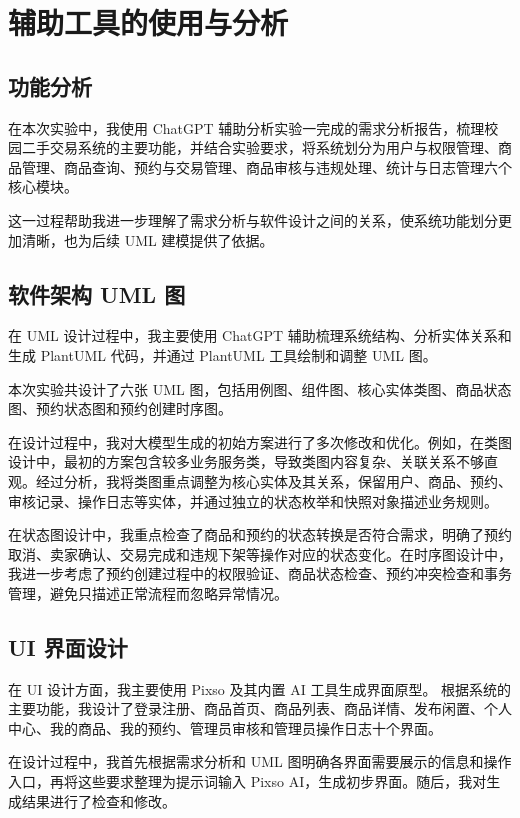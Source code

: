 \documentclass[12pt,a4paper]{article}
\begin{document}
	\section{辅助工具的使用与分析}
	
	\subsection{功能分析}
	
	在本次实验中，我使用 ChatGPT 辅助分析实验一完成的需求分析报告，梳理校园二手交易系统的主要功能，并结合实验要求，将系统划分为用户与权限管理、商品管理、商品查询、预约与交易管理、商品审核与违规处理、统计与日志管理六个核心模块。
	
	这一过程帮助我进一步理解了需求分析与软件设计之间的关系，使系统功能划分更加清晰，也为后续 UML 建模提供了依据。
	
	\subsection{软件架构 UML 图}
	
	在 UML 设计过程中，我主要使用 ChatGPT 辅助梳理系统结构、分析实体关系和生成 PlantUML 代码，并通过 PlantUML 工具绘制和调整 UML 图。
	
	本次实验共设计了六张 UML 图，包括用例图、组件图、核心实体类图、商品状态图、预约状态图和预约创建时序图。
	
	在设计过程中，我对大模型生成的初始方案进行了多次修改和优化。例如，在类图设计中，最初的方案包含较多业务服务类，导致类图内容复杂、关联关系不够直观。经过分析，我将类图重点调整为核心实体及其关系，保留用户、商品、预约、审核记录、操作日志等实体，并通过独立的状态枚举和快照对象描述业务规则。
	
	在状态图设计中，我重点检查了商品和预约的状态转换是否符合需求，明确了预约取消、卖家确认、交易完成和违规下架等操作对应的状态变化。在时序图设计中，我进一步考虑了预约创建过程中的权限验证、商品状态检查、预约冲突检查和事务管理，避免只描述正常流程而忽略异常情况。
	
	\subsection{UI 界面设计}
	
	在 UI 设计方面，我主要使用 Pixso 及其内置 AI 工具生成界面原型。	
	根据系统的主要功能，我设计了登录注册、商品首页、商品列表、商品详情、发布闲置、个人中心、我的商品、我的预约、管理员审核和管理员操作日志十个界面。
	
	在设计过程中，我首先根据需求分析和 UML 图明确各界面需要展示的信息和操作入口，再将这些要求整理为提示词输入 Pixso AI，生成初步界面。随后，我对生成结果进行了检查和修改。
	
\end{document}
